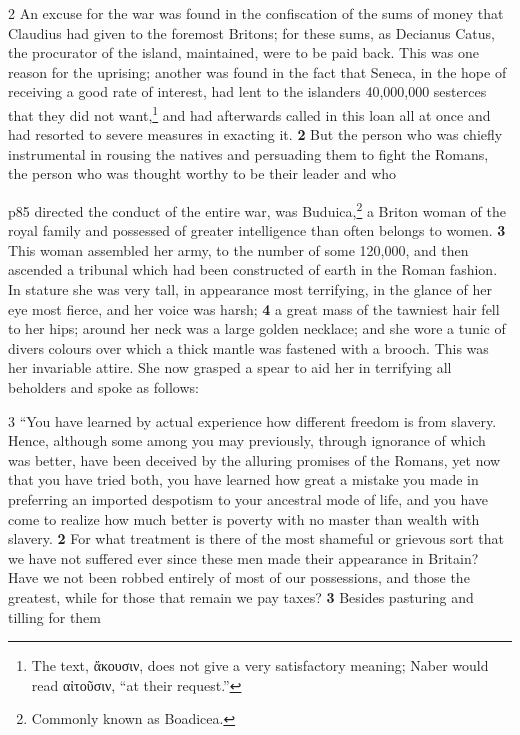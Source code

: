 2 An excuse for the war was found in the confiscation of the sums of money that Claudius had given to the foremost Britons; for these sums, as Decianus Catus, the procurator of the island, maintained, were to be paid back. This was one reason for the uprising; another was found in the fact that Seneca, in the hope of receiving a good rate of interest, had lent to the islanders 40,000,000 sesterces that they did not want,\texthebrew{⁠}\footnote{The text, \textgreek{\texthebrew{ἄ}κουσιν}, does not give a very satisfactory meaning; Naber would read \textgreek{α\texthebrew{ἰ}το\texthebrew{ῦ}σιν}, ``at their request.''

} and had afterwards called in this loan all at once and had resorted to severe measures in exacting it. \textbf{2} But the person who was chiefly instrumental in rousing the natives and persuading them to fight the Romans, the person who was thought worthy to be their leader and who

p85 directed the conduct of the entire war, was Buduica,\texthebrew{⁠}\footnote{Commonly known as Boadicea.

} a Briton woman of the royal family and possessed of greater intelligence than often belongs to women. \textbf{3} This woman assembled her army, to the number of some 120,000, and then ascended a tribunal which had been constructed of earth in the Roman fashion. In stature she was very tall, in appearance most terrifying, in the glance of her eye most fierce, and her voice was harsh; \textbf{4} a great mass of the tawniest hair fell to her hips; around her neck was a large golden necklace; and she wore a tunic of divers colours over which a thick mantle was fastened with a brooch. This was her invariable attire. She now grasped a spear to aid her in terrifying all beholders and spoke as follows:

3 ``You have learned by actual experience how different freedom is from slavery. Hence, although some among you may previously, through ignorance of which was better, have been deceived by the alluring promises of the Romans, yet now that you have tried both, you have learned how great a mistake you made in preferring an imported despotism to your ancestral mode of life, and you have come to realize how much better is poverty with no master than wealth with slavery. \textbf{2} For what treatment is there of the most shameful or grievous sort that we have not suffered ever since these men made their appearance in Britain? Have we not been robbed entirely of most of our possessions, and those the greatest, while for those that remain we pay taxes? \textbf{3} Besides pasturing and tilling for them

